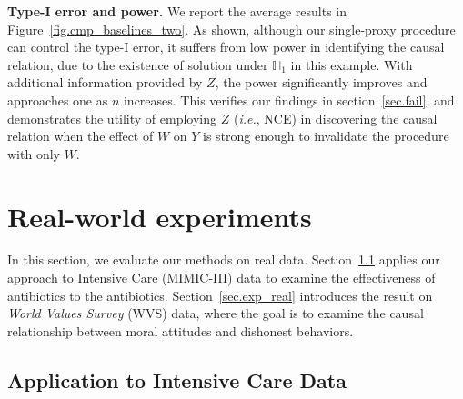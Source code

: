 \documentclass[
  12pt]{article}
\def\mH{\mathbb{H}}
\begin{document}
\textbf{Type-I error and power.} We report the average results in Figure~\ref{fig.cmp_baselines_two}. As shown, although our single-proxy procedure can control the type-I error, it suffers from low power in identifying the causal relation, due to the existence of solution under $\mH_1$ in this example. With additional information provided by $Z$, the power significantly improves and approaches one as $n$ increases. This verifies our findings in section~\ref{sec.fail}, and demonstrates the utility of employing $Z$ (\emph{i.e.}, NCE) in discovering the causal relation when the effect of $W$ on $Y$ is strong enough to invalidate the procedure with only $W$. 




\section{Real-world experiments}
\label{sec.real_world}

In this section, we evaluate our methods on real data. Section~\ref{sec.sepsis} applies our approach to Intensive Care (MIMIC-III) data to examine the effectiveness of antibiotics to the antibiotics. Section~\ref{sec.exp_real} introduces the result on \emph{World Values Survey} (WVS) data, where the goal is to examine the causal relationship between moral attitudes and dishonest behaviors. 

\subsection{Application to Intensive Care Data}\label{sec.sepsis}
\end{document}
